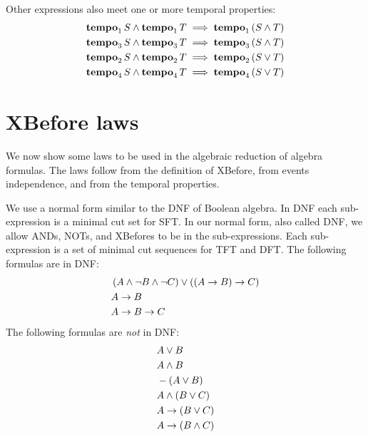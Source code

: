 Other expressions also meet one or more temporal properties:
\begin{subequations}
\begin{align}
\tempo[1]{S} \land \tempo[1]{T} & \implies \tempo[1]{\parsin{S \land T}}\label{law:tempo1-inter}\\
\tempo[3]{S} \land \tempo[3]{T} & \implies \tempo[3]{\parsin{S \land T}}\label{law:tempo3-inter}\\
\tempo[2]{S} \land \tempo[2]{T} & \implies \tempo[2]{\parsin{S \lor T}}\label{law:tempo2-union}\\
\tempo[4]{S} \land \tempo[4]{T} & \implies \tempo[4]{\parsin{S \lor T}}\label{law:tempo4-union}
\end{align}
\end{subequations}

\section{\acs*{XBefore} laws}
\label{sec:xbefore-laws}

We now show some laws to be used in the algebraic reduction of \ac{algebra} formulas.
The laws follow from the definition of \ac{XBefore}, from events independence, and from the temporal properties.

We use a normal form similar to the \ac{DNF} of Boolean algebra.
In \ac{DNF} each sub-expression is a minimal cut set for \ac{SFT}.
In our normal form, also called \ac{DNF}, we allow \acp{AND}, \acp{NOT}, and \acp{XBefore} to be in the sub-expressions.
Each sub-expression is a set of minimal cut sequences for \ac{TFT} and \ac{DFT}.
The following formulas are in \ac{DNF}:
%
\begin{align*}
&\parsin{A \land \lnot B \land \lnot C} \lor \parsin{\xbefore{\parsin{\xbefore{A}{B}}}{C}}\\
&\xbefore{A}{B}\\
&\xbefore{\xbefore{A}{B}}{C}
\end{align*}
%
The following formulas are \emph{not} in \ac{DNF}:
%
\begin{align*}
&A \lor B\\
&A \land B\\
&-\parsin{A \lor B}\\
&A \land \parsin{B \lor C}\\
&\xbefore{A}{\parsin{B \lor C}}\\
&\xbefore{A}{\parsin{B \land C}}
\end{align*}

